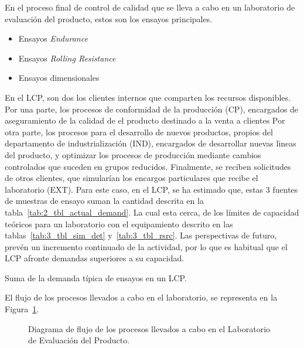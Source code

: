 En el proceso final de control de calidad
que se lleva a cabo en un laboratorio de evaluación del producto,
estos son los ensayos principales.

\begin{itemize}
	\item Ensayos \textit{Endurance}
	\item Ensayos \textit{Rolling Resistance}
	\item Ensayos dimensionales
\end{itemize}

En el LCP,
son dos los clientes internos que comparten los recursos disponibles.
Por una parte, los procesos de conformidad de la producción (CP),
encargados de aseguramiento de la calidad
de el producto destinado a la venta a clientes
Por otra parte, los procesos para el desarrollo de nuevos productos,
propios del departamento de industrialización (IND),
encargados de desarrollar nuevas lineas del producto,
y optimizar los procesos de producción
mediante cambios controlados que suceden en grupos reducidos.
Finalmente, se reciben solicitudes de otros clientes,
que simularían los encargos particulares que recibe el laboratorio (EXT).
Para este caso, en el LCP, se ha estimado que,
estas 3 fuentes de muestras de ensayo
suman la cantidad descrita en la tabla~\ref{tab:2_tbl_actual_demand}.
La cual esta cerca, de los límites de capacidad teóricos
para un laboratorio con el equipamiento descrito en
las tablas~\ref{tab:3_tbl_sim_det} y~\ref{tab:3_tbl_rsrc}.
Las perspectivas de futuro, prevén un incremento continuado de la actividad,
por lo que es habitual que el LCP afronte demandas superiores a su capacidad.

\begin{table}
	\centering
	\caption{Suma de la demanda típica de ensayos en un LCP.}
	
	\label{tab:2_tbl_actual_demand}
\end{table}

El flujo de los procesos llevados a cabo en el laboratorio,
se representa en la Figura~\ref{fig:2_fc_lep_diagram}.

\begin{figure}
	\begin{center}
		
	\end{center}
	\caption{Diagrama de flujo de los procesos llevados a cabo en el Laboratorio de Evaluación del Producto.}
	\label{fig:2_fc_lep_diagram}
\end{figure}

